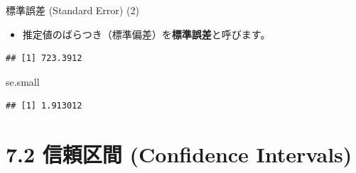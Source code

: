 \documentclass[
  ignorenonframetext,
]{beamer}
\newenvironment{Shaded}{\begin{snugshade}}{\end{snugshade}}
\newcommand{\AttributeTok}[1]{\textcolor[rgb]{0.77,0.63,0.00}{#1}}
\newcommand{\CommentTok}[1]{\textcolor[rgb]{0.56,0.35,0.01}{\textit{#1}}}
\newcommand{\ConstantTok}[1]{\textcolor[rgb]{0.00,0.00,0.00}{#1}}
\newcommand{\DecValTok}[1]{\textcolor[rgb]{0.00,0.00,0.81}{#1}}
\newcommand{\FunctionTok}[1]{\textcolor[rgb]{0.00,0.00,0.00}{#1}}
\newcommand{\NormalTok}[1]{#1}
\newcommand{\OtherTok}[1]{\textcolor[rgb]{0.56,0.35,0.01}{#1}}
\newcommand{\SpecialCharTok}[1]{\textcolor[rgb]{0.00,0.00,0.00}{#1}}
\providecommand{\tightlist}{%
  \setlength{\itemsep}{0pt}\setlength{\parskip}{0pt}}
\begin{document}
\begin{frame}[fragile]{標準誤差 (Standard Error) (2)}
\protect\hypertarget{ux6a19ux6e96ux8aa4ux5dee-standard-error-2}{}
\begin{itemize}
\tightlist
\item
  推定値のばらつき（標準偏差）を\textbf{標準誤差}と呼びます。
\end{itemize}

\scriptsize

\begin{Shaded}
\end{Shaded}

\begin{verbatim}
## [1] 723.3912
\end{verbatim}

\begin{Shaded}
\begin{Highlighting}[]
\NormalTok{se.small}
\end{Highlighting}
\end{Shaded}

\begin{verbatim}
## [1] 1.913012
\end{verbatim}

\normalsize
\end{frame}

\hypertarget{ux4fe1ux983cux533aux9593-confidence-intervals}{%
\section{7.2 信頼区間 (Confidence
Intervals)}\label{ux4fe1ux983cux533aux9593-confidence-intervals}}
\end{document}
